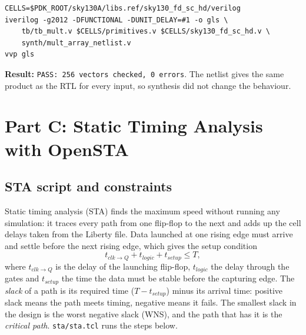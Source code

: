 \documentclass[10pt,a4paper,twocolumn]{article}
\begin{document}
\begin{lstlisting}[frame=none, xleftmargin=1.5em]
CELLS=$PDK_ROOT/sky130A/libs.ref/sky130_fd_sc_hd/verilog
iverilog -g2012 -DFUNCTIONAL -DUNIT_DELAY=#1 -o gls \
    tb/tb_mult.v $CELLS/primitives.v $CELLS/sky130_fd_sc_hd.v \
    synth/mult_array_netlist.v
vvp gls
\end{lstlisting}

\textbf{Result:} \texttt{PASS: 256 vectors checked, 0 errors}. The netlist gives the same product as the RTL
for every input, so synthesis did not change the behaviour.

\section{Part C: Static Timing Analysis with OpenSTA}

\subsection{STA script and constraints}

Static timing analysis (STA) finds the maximum speed without running any simulation: it traces every path
from one flip-flop to the next and adds up the cell delays taken from the Liberty file. Data launched at one
rising edge must arrive and settle before the next rising edge, which gives the setup condition
\[
t_{clk\rightarrow Q} + t_{logic} + t_{setup} \le T ,
\]
where $t_{clk\rightarrow Q}$ is the delay of the launching flip-flop, $t_{logic}$ the delay through the gates and
$t_{setup}$ the time the data must be stable before the capturing edge. The \emph{slack} of a path is its
required time ($T - t_{setup}$) minus its arrival time: positive slack means the path meets timing, negative
means it fails. The smallest slack in the design is the worst negative slack (WNS), and the path that has it
is the \emph{critical path}. \texttt{sta/sta.tcl} runs the steps below.
\end{document}
